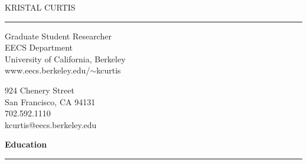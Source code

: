 \documentclass[11pt]{article}
\title{}
\author{}
\date{}
\newcommand{\head}[1]{
{\bf #1} \\
\rule{\textwidth}{0.01 in}

\vspace{-0.35 in}

}
\begin{document}

% 




\begin{center}{\Huge KRISTAL CURTIS} \end{center}
\rule{\textwidth}{0.01 in}

\begin{minipage}{0.5 \textwidth}
\begin{flushleft}
Graduate Student Researcher \\
EECS Department\\
University of California, Berkeley \\
www.eecs.berkeley.edu/$\sim$kcurtis
\ 
\end{flushleft}
\end{minipage}
\begin{minipage}{0.5 \textwidth}
\begin{flushright}
924 Chenery Street\\
San Francisco, CA 94131\\
702.592.1110\\
kcurtis@eecs.berkeley.edu\\
\end{flushright}
\end{minipage}
\vspace{0.1 in}


\head{Education}
\end{document}
